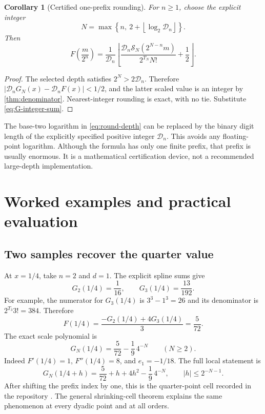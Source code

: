 \documentclass[11pt,a4paper]{article}
\numberwithin{equation}{section}
\newtheorem{corollary}[theorem]{Corollary}
\theoremstyle{definition}
\theoremstyle{remark}
\newcommand{\floor}[1]{\left\lfloor #1\right\rfloor}
\begin{document}
\begin{corollary}[Certified one-prefix rounding]
\label{cor:rounding}
For $n\ge1$, choose the explicit integer
\begin{equation}
 N=\max\left\{n,\ 2+\floor{\log_2\mathcal D_n}\right\}.
 \label{eq:round-depth}
\end{equation}
Then
\begin{equation}
 \boxed{\displaystyle
 F\!\left(\frac m{2^n}\right)=
 \frac1{\mathcal D_n}
 \floor{\frac{\mathcal D_n\mathcal S_N(2^{N-n}m)}
             {2^{T_N}N!}+\frac12}.}
 \label{eq:rounding-formula}
\end{equation}
\end{corollary}
\begin{proof}
The selected depth satisfies $2^N>2\mathcal D_n$. Therefore
$|\mathcal D_nG_N(x)-\mathcal D_nF(x)|<1/2$, and the latter scaled value is an integer by \cref{thm:denominator}. Nearest-integer rounding is exact, with no tie. Substitute \cref{eq:G-integer-sum}.
\end{proof}
The base-two logarithm in \cref{eq:round-depth} can be replaced by the binary digit length of the explicitly specified positive integer $\mathcal D_n$. This avoids any floating-point logarithm. Although the formula has only one finite prefix, that prefix is usually enormous. It is a mathematical certification device, not a recommended large-depth implementation.

\section{Worked examples and practical evaluation}
\label{sec:examples}

\subsection{Two samples recover the quarter value}
At $x=1/4$, take $n=2$ and $d=1$. The explicit spline sums give
\[
 G_2(1/4)=\frac1{16},\qquad G_3(1/4)=\frac{13}{192}.
\]
For example, the numerator for $G_3(1/4)$ is $3^3-1^3=26$ and its denominator is $2^{T_3}3!=384$. Therefore
\begin{equation}
 F(1/4)=\frac{-G_2(1/4)+4G_3(1/4)}3
       =\frac5{72}.
 \label{eq:example-quarter}
\end{equation}
The exact scale polynomial is
\begin{equation}
 G_N(1/4)=\frac5{72}-\frac19\,4^{-N}\qquad(N\ge2).
 \label{eq:quarter-poly}
\end{equation}
Indeed $F'(1/4)=1$, $F''(1/4)=8$, and $e_1=-1/18$. The full local statement is
\begin{equation}
 G_N(1/4+h)=\frac5{72}+h+4h^2-\frac19\,4^{-N},
 \qquad |h|\le2^{-N-1}.
 \label{eq:quarter-cell}
\end{equation}
After shifting the prefix index by one, this is the quarter-point cell recorded in the repository \cite{repo}. The general shrinking-cell theorem explains the same phenomenon at every dyadic point and at all orders.
\end{document}
